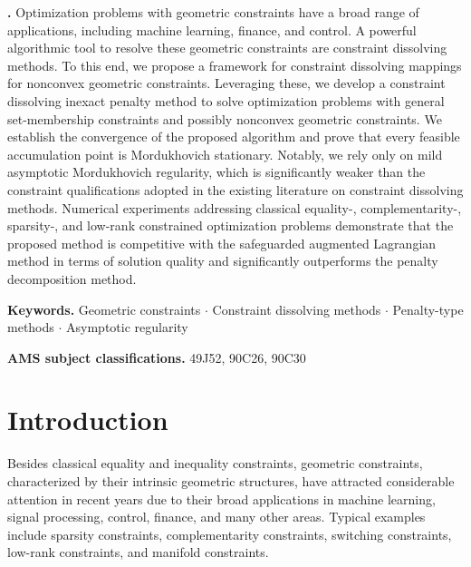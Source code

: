 \documentclass[11pt,a4paper,reqno]{amsart}
\newcommand{\mscLink}[1]{#1}
\begin{document}
\maketitle
{
\small\textbf{\abstractname.}
Optimization problems with geometric constraints have a broad range of applications, including machine learning, finance, and control. A powerful algorithmic tool to resolve these geometric constraints are constraint dissolving methods.
To this end, we propose a framework for constraint dissolving mappings for nonconvex geometric constraints. %
Leveraging these, we develop a constraint dissolving inexact penalty method to solve %
optimization problems with general set-membership constraints and possibly nonconvex geometric constraints. 
We establish the convergence of the proposed algorithm and prove that every feasible accumulation point is Mordukhovich stationary. Notably, we rely only on mild asymptotic Mordukhovich regularity, which is significantly weaker than the constraint qualifications adopted in the existing literature on constraint dissolving methods. Numerical experiments addressing classical equality-, complementarity-, sparsity-, and low-rank constrained optimization problems demonstrate that the proposed method is competitive with the safeguarded augmented Lagrangian method in terms of solution quality and significantly outperforms the penalty decomposition method.
\par\addvspace{\baselineskip}


{
\small\textbf{Keywords.}
	Geometric constraints $\cdot$ Constraint dissolving methods $\cdot$ Penalty-type methods $\cdot$ Asymptotic regularity 
\par\addvspace{\baselineskip}
}

{
\small\textbf{AMS subject classifications.}
	\mscLink{49J52}, \mscLink{90C26}, \mscLink{90C30}
\par\addvspace{\baselineskip}
}

\maketitle

\section{Introduction}
\noindent Besides classical equality and inequality constraints, geometric constraints, characterized by their intrinsic geometric structures, have attracted considerable attention in recent years due to their broad applications in machine learning, signal processing, control, finance, and many other areas. Typical examples include sparsity constraints, complementarity constraints, switching constraints, low-rank constraints, and manifold constraints. 

}
\end{document}

